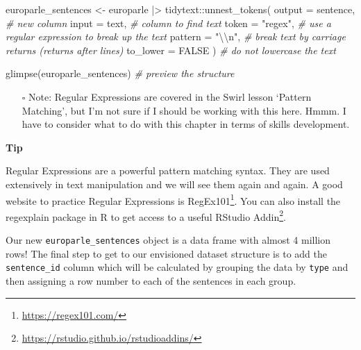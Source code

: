 \documentclass[
  letterpaper,
  DIV=11,
  numbers=noendperiod]{scrreport}
\newenvironment{Shaded}{\begin{snugshade}}{\end{snugshade}}
\newcommand{\AttributeTok}[1]{\textcolor[rgb]{0.00,0.00,0.00}{#1}}
\newcommand{\CommentTok}[1]{\textcolor[rgb]{0.00,0.00,0.00}{\textit{#1}}}
\newcommand{\ConstantTok}[1]{\textcolor[rgb]{0.00,0.00,0.00}{#1}}
\newcommand{\FunctionTok}[1]{\textcolor[rgb]{0.00,0.00,0.00}{#1}}
\newcommand{\NormalTok}[1]{\textcolor[rgb]{0.00,0.00,0.00}{#1}}
\newcommand{\OtherTok}[1]{\textcolor[rgb]{0.00,0.00,0.00}{#1}}
\newcommand{\SpecialCharTok}[1]{\textcolor[rgb]{0.00,0.00,0.00}{#1}}
\newcommand{\StringTok}[1]{\textcolor[rgb]{0.00,0.00,0.00}{#1}}
\providecommand{\tightlist}{%
  \setlength{\itemsep}{0pt}\setlength{\parskip}{0pt}}\usepackage{longtable,booktabs,array}
\theoremstyle{definition}
\theoremstyle{remark}
\DeclareRobustCommand{\href}[2]{#2\footnote{\url{#1}}}
\begin{document}
\begin{Shaded}
\begin{Highlighting}[]
\NormalTok{europarle\_sentences }\OtherTok{\textless{}{-}}
\NormalTok{  europarle }\SpecialCharTok{|\textgreater{}}
\NormalTok{  tidytext}\SpecialCharTok{::}\FunctionTok{unnest\_tokens}\NormalTok{(}
    \AttributeTok{output =}\NormalTok{ sentence, }\CommentTok{\# new column}
    \AttributeTok{input =}\NormalTok{ text, }\CommentTok{\# column to find text}
    \AttributeTok{token =} \StringTok{"regex"}\NormalTok{, }\CommentTok{\# use a regular expression to break up the text}
    \AttributeTok{pattern =} \StringTok{"}\SpecialCharTok{\textbackslash{}\textbackslash{}}\StringTok{n"}\NormalTok{, }\CommentTok{\# break text by carriage returns (returns after lines)}
    \AttributeTok{to\_lower =} \ConstantTok{FALSE}
\NormalTok{  ) }\CommentTok{\# do not lowercase the text}

\FunctionTok{glimpse}\NormalTok{(europarle\_sentences) }\CommentTok{\# preview the structure}
\end{Highlighting}
\end{Shaded}

\begin{itemize}
\tightlist
\item[$\square$]
  Note: Regular Expressions are covered in the Swirl lesson `Pattern
  Matching', but I'm not sure if I should be working with this here.
  Hmmm. I have to consider what to do with this chapter in terms of
  skills development.
\end{itemize}

\begin{tcolorbox}[enhanced jigsaw, breakable, arc=.35mm, leftrule=.75mm, rightrule=.15mm, colback=white, toprule=.15mm, bottomrule=.15mm, opacityback=0, left=2mm]

\textbf{ Tip}

Regular Expressions are a powerful pattern matching syntax. They are
used extensively in text manipulation and we will see them again and
again. A good website to practice Regular Expressions is
\href{https://regex101.com/}{RegEx101}. You can also install the
regexplain package in R to get access to a useful
\href{https://rstudio.github.io/rstudioaddins/}{RStudio Addin}.

\end{tcolorbox}

Our new \texttt{europarle\_sentences} object is a data frame with almost
4 million rows! The final step to get to our envisioned dataset
structure is to add the \texttt{sentence\_id} column which will be
calculated by grouping the data by \texttt{type} and then assigning a
row number to each of the sentences in each group.
\end{document}
